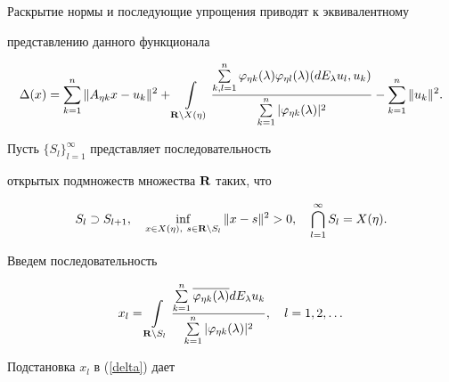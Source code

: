 Раскрытие нормы и последующие упрощения приводят к эквивалентному


представлению данного функционала


\begin{equation}


\label{ndelta}


\Delta ( x)= \sum_{k=1}^n\| A_{\eta


k}x-u_k\|^2 + \int\limits_{{\bold R}\setminus X( \eta ) }


\frac{\sum\limits_{k,l=1}^n\varphi_{\eta k}( \lambda ) \varphi


_{\eta l}( \lambda ) ( dE_\lambda u_l,u_k) }{%


\sum\limits_{k=1}^n| \varphi_{\eta k}( \lambda ) |^2}


-\sum_{k=1}^n\| u_k\|^2. 


\end{equation}


Пусть $\{ S_l\}_{l=1}^\infty $ представляет последовательность


открытых подмножеств множества ${\bold R}$ таких, что 


$$


S_l \supset S_{l+1}, \quad \inf_{x\in X( \eta ),\ s\in {\bold R}


\setminus S_l} \| x-s\|^2 > 0, \quad \bigcap_{l=1}^\infty S_l =


X( \eta ). 


$$


Введем последовательность 


$$


x_l=\int\limits_{{\bold R} \setminus S_l} \frac{\sum\limits_{k=1}^n\overline{


\varphi_{\eta k}( \lambda ) }dE_\lambda u_k}{\sum\limits_{k=1}^n%


| \varphi_{\eta k}( \lambda ) |^2}, \quad l=1,2,\dotsc


$$


Подстановка $x_l$ в (\ref{delta}) дает 


